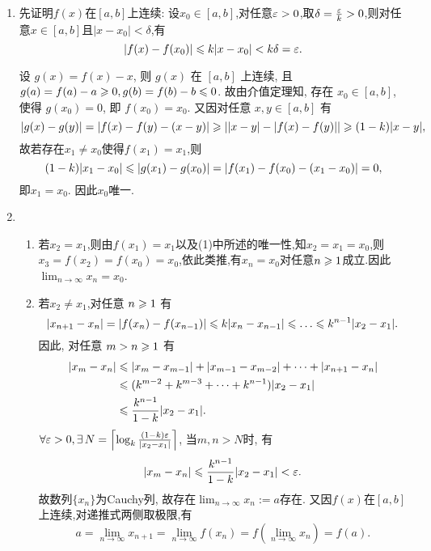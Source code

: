 \begin{solution}
    \begin{enumerate}
        \item 先证明$f(x)$在$[a,b]$上连续:
              设$x_0 \in [a,b]$,对任意$\varepsilon > 0$,取$\delta = \frac{\varepsilon}{k} > 0$,则对任意$x \in [a,b]$且$|x-x_0| < \delta$,有
              $$|f(x)-f(x_0)| \leqslant k|x-x_0| < k\delta = \varepsilon.$$

              设 $g(x) = f(x) - x$, 则 $g(x)$ 在 $[a,b]$ 上连续, 且 $g(a) = f(a) - a \geqslant 0, g(b) = f(b) - b \leqslant 0$. 故由介值定理知, 存在 $x_0 \in [a,b]$, 使得 $g(x_0) = 0$, 即 $f(x_0) = x_0$. 又因对任意 $x,y \in [a,b]$ 有
              $$|g(x)-g(y)| = |f(x)-f(y)-(x-y)| \geqslant ||x-y| - |f(x)-f(y)|| \geqslant (1-k)|x-y|,$$
              故若存在$x_1 \ne x_0$使得$f(x_1) = x_1$,则
              $$(1-k)|x_1-x_0| \leqslant |g(x_1)-g(x_0)| = |f(x_1)-f(x_0)-(x_1-x_0)| = 0,$$
              即$x_1 = x_0$. 因此$x_0$唯一.
        \item \begin{enumerate}
                  \item 若$x_2 = x_1$,则由$f(x_1) = x_1$以及(1)中所述的唯一性,知$x_2 = x_1 = x_0$,则$x_3 = f(x_2) = f(x_0) = x_0$,依此类推,有$x_n = x_0$对任意$n \geqslant 1$成立.因此$\lim_{n \to \infty} x_n = x_0$.
                  \item 若$x_2 \ne x_1$,对任意 $n \geqslant 1$ 有
                        $$|x_{n+1} - x_n| = |f(x_n) - f(x_{n-1})| \les k|x_n - x_{n-1}| \les \dots \les k^{n-1}|x_2 - x_1|.$$
                        因此, 对任意 $m > n \geqslant 1$ 有
                        \begin{align*}
                            |x_m - x_n| & \leqslant |x_m - x_{m-1}| + |x_{m-1} - x_{m-2}| + \dots + |x_{n+1} - x_n| \\
                                        & \leqslant (k^{m-2} + k^{m-3} + \dots + k^{n-1})|x_2 - x_1|                \\
                                        & \leqslant \frac{k^{n-1}}{1-k}|x_2 - x_1|.
                        \end{align*}
                        $\forall \ve > 0, \exists N = \left\lceil \log_k \frac{(1-k)\ve}{|x_2 - x_1|} \right\rceil$, 当$m,n > N$时, 有
                        $$|x_m - x_n| \leqslant \frac{k^{n-1}}{1-k}|x_2 - x_1| < \varepsilon.$$
                        故数列$\{x_n\}$为Cauchy列, 故存在$\lim_{n \to \infty} x_n:=a$存在. 又因$f(x)$在$[a,b]$上连续,对递推式两侧取极限,有
                        $$a = \lim_{n \to \infty} x_{n+1} = \lim_{n \to \infty} f(x_n) = f\left( \lim_{n \to \infty} x_n \right) = f(a).$$

\end{enumerate}
\end{enumerate}
\end{solution}
